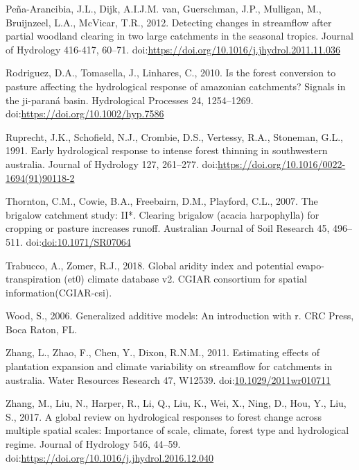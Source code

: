 \documentclass[]{elsarticle} %
\begin{document}
\leavevmode\hypertarget{ref-pena-arancibia2012}{}%
Peña-Arancibia, J.L., Dijk, A.I.J.M. van, Guerschman, J.P., Mulligan,
M., Bruijnzeel, L.A., McVicar, T.R., 2012. Detecting changes in
streamflow after partial woodland clearing in two large catchments in
the seasonal tropics. Journal of Hydrology 416-417, 60--71.
doi:\href{https://doi.org/https://doi.org/10.1016/j.jhydrol.2011.11.036}{https://doi.org/10.1016/j.jhydrol.2011.11.036}

\leavevmode\hypertarget{ref-rodriguez2010}{}%
Rodriguez, D.A., Tomasella, J., Linhares, C., 2010. Is the forest
conversion to pasture affecting the hydrological response of amazonian
catchments? Signals in the ji-paraná basin. Hydrological Processes 24,
1254--1269.
doi:\href{https://doi.org/https://doi.org/10.1002/hyp.7586}{https://doi.org/10.1002/hyp.7586}

\leavevmode\hypertarget{ref-ruprechtetal1991}{}%
Ruprecht, J.K., Schofield, N.J., Crombie, D.S., Vertessy, R.A.,
Stoneman, G.L., 1991. Early hydrological response to intense forest
thinning in southwestern australia. Journal of Hydrology 127, 261--277.
doi:\href{https://doi.org/https://doi.org/10.1016/0022-1694(91)90118-2}{https://doi.org/10.1016/0022-1694(91)90118-2}

\leavevmode\hypertarget{ref-thornton2007}{}%
Thornton, C.M., Cowie, B.A., Freebairn, D.M., Playford, C.L., 2007. The
brigalow catchment study: II*. Clearing brigalow (acacia harpophylla)
for cropping or pasture increases runoff. Australian Journal of Soil
Research 45, 496--511.
doi:\href{https://doi.org/doi:10.1071/SR07064}{doi:10.1071/SR07064}

\leavevmode\hypertarget{ref-trabucco2018}{}%
Trabucco, A., Zomer, R.J., 2018. Global aridity index and potential
evapo-transpiration (et0) climate database v2. CGIAR consortium for
spatial information(CGIAR-csi).

\leavevmode\hypertarget{ref-wood2006}{}%
Wood, S., 2006. Generalized additive models: An introduction with r. CRC
Press, Boca Raton, FL.

\leavevmode\hypertarget{ref-zhang2011}{}%
Zhang, L., Zhao, F., Chen, Y., Dixon, R.N.M., 2011. Estimating effects
of plantation expansion and climate variability on streamflow for
catchments in australia. Water Resources Research 47, W12539.
doi:\href{https://doi.org/10.1029/2011wr010711}{10.1029/2011wr010711}

\leavevmode\hypertarget{ref-zhang2017}{}%
Zhang, M., Liu, N., Harper, R., Li, Q., Liu, K., Wei, X., Ning, D., Hou,
Y., Liu, S., 2017. A global review on hydrological responses to forest
change across multiple spatial scales: Importance of scale, climate,
forest type and hydrological regime. Journal of Hydrology 546, 44--59.
doi:\href{https://doi.org/https://doi.org/10.1016/j.jhydrol.2016.12.040}{https://doi.org/10.1016/j.jhydrol.2016.12.040}
\end{document}

